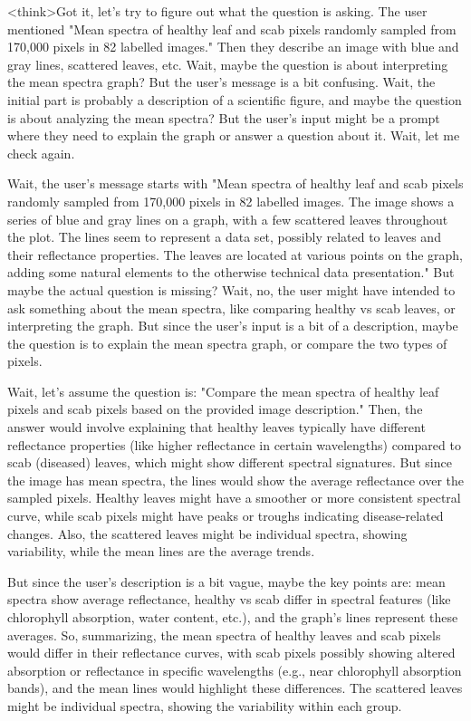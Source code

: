<think>Got it, let's try to figure out what the question is asking. The user mentioned "Mean spectra of healthy leaf and scab pixels randomly sampled from 170,000 pixels in 82 labelled images." Then they describe an image with blue and gray lines, scattered leaves, etc. Wait, maybe the question is about interpreting the mean spectra graph? But the user's message is a bit confusing. Wait, the initial part is probably a description of a scientific figure, and maybe the question is about analyzing the mean spectra? But the user's input might be a prompt where they need to explain the graph or answer a question about it. Wait, let me check again.

Wait, the user's message starts with "Mean spectra of healthy leaf and scab pixels randomly sampled from 170,000 pixels in 82 labelled images. The image shows a series of blue and gray lines on a graph, with a few scattered leaves throughout the plot. The lines seem to represent a data set, possibly related to leaves and their reflectance properties. The leaves are located at various points on the graph, adding some natural elements to the otherwise technical data presentation." But maybe the actual question is missing? Wait, no, the user might have intended to ask something about the mean spectra, like comparing healthy vs scab leaves, or interpreting the graph. But since the user's input is a bit of a description, maybe the question is to explain the mean spectra graph, or compare the two types of pixels.

Wait, let's assume the question is: "Compare the mean spectra of healthy leaf pixels and scab pixels based on the provided image description." Then, the answer would involve explaining that healthy leaves typically have different reflectance properties (like higher reflectance in certain wavelengths) compared to scab (diseased) leaves, which might show different spectral signatures. But since the image has mean spectra, the lines would show the average reflectance over the sampled pixels. Healthy leaves might have a smoother or more consistent spectral curve, while scab pixels might have peaks or troughs indicating disease-related changes. Also, the scattered leaves might be individual spectra, showing variability, while the mean lines are the average trends.

But since the user's description is a bit vague, maybe the key points are: mean spectra show average reflectance, healthy vs scab differ in spectral features (like chlorophyll absorption, water content, etc.), and the graph's lines represent these averages. So, summarizing, the mean spectra of healthy leaves and scab pixels would differ in their reflectance curves, with scab pixels possibly showing altered absorption or reflectance in specific wavelengths (e.g., near chlorophyll absorption bands), and the mean lines would highlight these differences. The scattered leaves might be individual spectra, showing the variability within each group.

